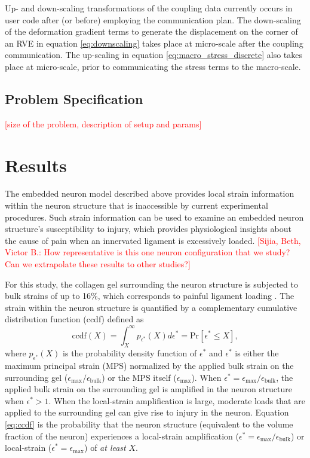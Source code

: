 \documentclass[]{interact}
\newcommand{\red}[1]{\textcolor{red}{[#1]}}
\begin{document}
Up- and down-scaling transformations of the coupling data currently occurs in user code after (or before) employing the communication plan. The down-scaling of the deformation gradient terms to generate the displacement on the corner of an RVE in equation \ref{eq:downscaling} takes place at micro-scale after the coupling communication. The up-scaling in equation \ref{eq:macro_stress_discrete} also takes place at micro-scale, prior to communicating the stress terms to the macro-scale.

\subsection{Problem Specification}\label{sec:specification}
\red{size of the problem, description of setup and params}


\section{Results}
\label{sec:results}

The embedded neuron model described above provides local strain information within the neuron structure that is inaccessible by current experimental procedures. Such strain information can be used to examine an embedded neuron structure's susceptibility to injury, which provides physiological insights about the cause of pain when an innervated ligament is excessively loaded. \red{Sijia, Beth, Victor B.: How representative is this one neuron configuration that we study? Can we extrapolate these results to other studies?} 

For this study, the collagen gel surrounding the neuron structure is subjected to bulk strains of up to 16$\%$, which corresponds to painful ligament loading \citep{Zhang:2016ga}. The strain within the neuron structure is quantified by a complementary cumulative distribution function (ccdf) defined as 
%
\begin{equation}
\text{ccdf}(X) = \int_{X}^{\infty} p_{\epsilon^*}(X)d\epsilon^* = \text{Pr}[ \epsilon^*\le X],
\label{eq:ccdf}
\end{equation}
%
where $p_{\epsilon^*}(X)$ is the probability density function of $\epsilon^*$ and $\epsilon^*$ is either the maximum principal strain (MPS) normalized by the applied bulk strain on the surrounding gel ($\epsilon_{\text{max}}/\epsilon_{\text{bulk}}$) or the MPS itself ($\epsilon_{\text{max}}$). When $\epsilon^* = \epsilon_{\text{max}}/\epsilon_{\text{bulk}}$, the applied bulk strain on the surrounding gel is amplified in the neuron structure when $\epsilon^* > 1$. When the local-strain amplification is large, moderate loads that are applied to the surrounding gel can give rise to injury in the neuron. Equation \ref{eq:ccdf} is the probability that the neuron structure (equivalent to the volume fraction of the neuron) experiences a local-strain amplification ($\epsilon^* = \epsilon_{\text{max}}/\epsilon_{\text{bulk}}$) or local-strain ($\epsilon^* = \epsilon_{\text{max}}$) of \textit{at least} $X$. 
\end{document}
